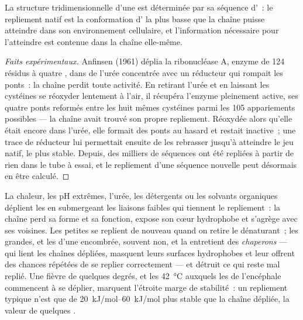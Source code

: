 \begin{theorem}\label{thm:b1:proteins:anfinsen}
La structure tridimensionnelle d'une  est déterminée par sa
séquence d'~: le repliement natif est la conformation
d' la plus basse que la chaîne puisse atteindre dans son
environnement cellulaire, et l'information nécessaire pour l'atteindre
est contenue dans la chaîne elle-même.
\end{theorem}
\begin{proof}[Faits expérimentaux]
Anfinsen (1961) déplia la ribonucléase A, enzyme de \qty{124}{} résidus
à quatre , dans de l'urée concentrée avec un réducteur
qui rompait les ponts~: la chaîne perdit toute activité. En retirant
l'urée et en laissant les cystéines se réoxyder lentement à l'air, il
récupéra l'enzyme pleinement active, ses quatre ponts reformés entre les
huit mêmes cystéines parmi les \qty{105}{} appariements possibles ---
la chaîne avait trouvé son propre repliement. Réoxydée alors qu'elle
était encore dans l'urée, elle formait des ponts au hasard et restait
inactive~; une trace de réducteur lui permettait ensuite de les
rebrasser jusqu'à atteindre le jeu natif, le plus stable. Depuis, des
milliers de séquences ont été repliées à partir de rien dans le tube à
essai, et le repliement d'une séquence nouvelle peut désormais en être
calculé.
\end{proof}

\begin{proposition}[Dénaturation]\label{prop:b1:proteins:denaturation}
La chaleur, les pH extrêmes, l'urée, les détergents ou les solvants
organiques déplient les  en submergeant les liaisons faibles
qui tiennent le repliement~: la chaîne perd sa forme et sa fonction,
expose son cœur hydrophobe et s'agrège avec ses voisines. Les petites
 se replient de nouveau quand on retire le dénaturant~; les
grandes, et les  d'une  encombrée, souvent non, et la
 entretient des \emph{chaperons} --- 
qui lient les chaînes dépliées, masquent leurs surfaces hydrophobes et
leur offrent des chances répétées de se replier correctement --- et
détruit ce qui reste mal replié. Une fièvre de quelques degrés, et les
\qty{42}{\celsius} auxquels les  de l'encéphale commencent à se
déplier, marquent l'étroite marge de stabilité~: un repliement typique
n'est que de \qtyrange{20}{60}{kJ/mol} plus stable que la chaîne
dépliée, la valeur de quelques .
\end{proposition}

